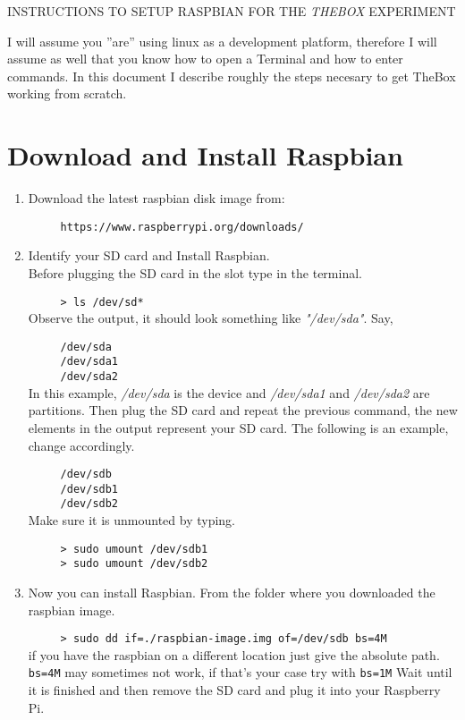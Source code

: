 \begin{center}
 INSTRUCTIONS TO SETUP RASPBIAN FOR THE \emph{THEBOX} EXPERIMENT

\end{center}


I will assume you ''are'' using linux as a development platform, therefore I will assume
as well that you know how to open a Terminal and how to enter commands. In this document I describe roughly the steps necesary to 
get TheBox working from scratch.


 \section{Download and Install Raspbian}
    \begin{enumerate}
    \item Download the latest raspbian disk image from:
    
         \verb=     https://www.raspberrypi.org/downloads/=
    \item Identify your SD card and Install Raspbian.\\
     Before plugging the SD card in the slot type in the terminal.
     
         \verb=     > ls /dev/sd*=\\
     Observe the output, it should look something like \emph{"/dev/sda"}. Say,
     
         \verb=     /dev/sda=\\
         \verb=     /dev/sda1=\\
         \verb=     /dev/sda2=\\
     In this example, \emph{/dev/sda} is the device and \emph{/dev/sda1} and \emph{/dev/sda2} are partitions.
     Then plug the SD card and repeat the previous command, the new elements in the output
     represent your SD card. The following is an example, change accordingly.
     
         \verb=     /dev/sdb=\\
         \verb=     /dev/sdb1=\\
         \verb=     /dev/sdb2=\\
     Make sure it is unmounted by typing.
     
         \verb=     > sudo umount /dev/sdb1=\\
         \verb=     > sudo umount /dev/sdb2=\\
    \item Now you can install Raspbian. From the folder where you downloaded the raspbian image.
    
         \verb+     > sudo dd if=./raspbian-image.img of=/dev/sdb bs=4M+\\
     if you have the raspbian on a different location just give the absolute path. \verb+bs=4M+
     may sometimes not work, if that's your case try with \verb+bs=1M+
     Wait until it is finished and then remove the SD card and plug it into your Raspberry Pi.
  \end{enumerate}
